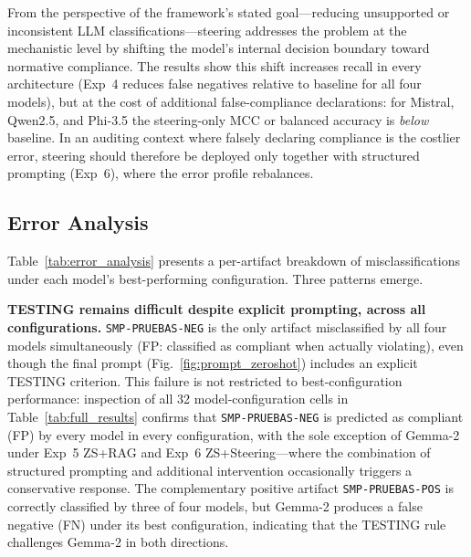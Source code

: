 \documentclass{ieeeaccess}
\begin{document}
From the perspective of the framework's stated goal---reducing unsupported or inconsistent LLM classifications---steering addresses the problem at the mechanistic level by shifting the model's internal decision boundary toward normative compliance. The results show this shift increases recall in every architecture (Exp~4 reduces false negatives relative to baseline for all four models), but at the cost of additional false-compliance declarations: for Mistral, Qwen2.5, and Phi-3.5 the steering-only MCC or balanced accuracy is \emph{below} baseline. In an auditing context where falsely declaring compliance is the costlier error, steering should therefore be deployed only together with structured prompting (Exp~6), where the error profile rebalances.

\subsection{Error Analysis}

Table~\ref{tab:error_analysis} presents a per-artifact breakdown of misclassifications under each model's best-performing configuration. Three patterns emerge.

\textbf{TESTING remains difficult despite explicit prompting, across all configurations.} \texttt{SMP-PRUEBAS-NEG} is the only artifact misclassified by all four models simultaneously (FP: classified as compliant when actually violating), even though the final prompt (Fig.~\ref{fig:prompt_zeroshot}) includes an explicit TESTING criterion. This failure is not restricted to best-configuration performance: inspection of all 32 model-configuration cells in Table~\ref{tab:full_results} confirms that \texttt{SMP-PRUEBAS-NEG} is predicted as compliant (FP) by every model in every configuration, with the sole exception of Gemma-2 under Exp~5 ZS+RAG and Exp~6 ZS+Steering---where the combination of structured prompting and additional intervention occasionally triggers a conservative response. The complementary positive artifact \texttt{SMP-PRUEBAS-POS} is correctly classified by three of four models, but Gemma-2 produces a false negative (FN) under its best configuration, indicating that the TESTING rule challenges Gemma-2 in both directions.
\end{document}
